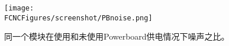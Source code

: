 \begin{figure}[H]
\centering
\texttt{[image: \\FCNCFigures/screenshot/PBnoise.png]}
\caption{同一个模块在使用和未使用Powerboard供电情况下噪声之比。}
\label{fig:PBnoise}
\end{figure}
